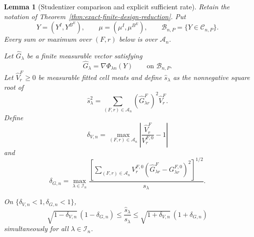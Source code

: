 \documentclass[11pt]{article}
\newtheorem{lemma}[theorem]{Lemma}
\theoremstyle{definition}
\newcommand{\1}{\mathbf 1}\newcommand{\op}{\operatorname}
\begin{document}
\begin{lemma}[Studentizer comparison and explicit sufficient rate]
\label{lem:studentizer-transfer-final}
Retain the notation of
Theorem~\ref{thm:exact-finite-design-reduction}. Put
\[
Y=(Y^I,Y^{B^E}),
\qquad
\mu=(\mu^I,\mu^{B^E}),
\qquad
\mathcal B_{n,P}=\{Y\in\mathcal C_{n,P}\}.
\]
Every sum or maximum over $(F,r)$ below is over
$\mathcal A_n$.

Let $\widehat G_\lambda$ be a finite measurable vector satisfying
\begin{equation}
\widehat G_\lambda
=
\nabla\Phi_{\lambda n}(Y)
\qquad\text{on }\mathcal B_{n,P}.
\label{eq:fitted-gradient-agreement}
\end{equation}
Let $\widehat V_r^F\ge0$ be measurable fitted cell meats and define
$\widehat s_\lambda$ as the nonnegative square root of
\begin{equation}
\widehat s_\lambda^2
=
\sum_{(F,r)\in\mathcal A_n}
(\widehat G_{\lambda r}^F)^2
\widehat V_r^F.
\label{eq:fitted-studentizer-final}
\end{equation}
Define
\begin{equation}
\delta_{V,n}
=
\max_{(F,r)\in\mathcal A_n}
\left|
\frac{\widehat V_r^F}{V_r^{F,0}}-1
\right|
\label{eq:studentizer-meat-error-final}
\end{equation}
and
\begin{equation}
\delta_{G,n}
=
\max_{\lambda\in\mathcal I_n}
\frac{
\left[
\sum_{(F,r)\in\mathcal A_n}
V_r^{F,0}
(\widehat G_{\lambda r}^F-G_{\lambda r}^{F,0})^2
\right]^{1/2}
}{s_\lambda}.
\label{eq:studentizer-gradient-error-final}
\end{equation}

On $\{\delta_{V,n}<1,\delta_{G,n}<1\}$,
\begin{equation}
\sqrt{1-\delta_{V,n}}\,(1-\delta_{G,n})
\le
\frac{\widehat s_\lambda}{s_\lambda}
\le
\sqrt{1+\delta_{V,n}}\,(1+\delta_{G,n})
\label{eq:studentizer-sandwich-final}
\end{equation}
simultaneously for all $\lambda\in\mathcal I_n$.


\end{lemma}
\end{document}
